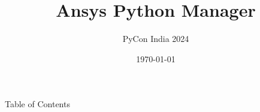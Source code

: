 \documentclass[t]{beamer}
\begin{document}
	
	
	\title{Ansys Python Manager}
	\subtitle{PyCon India 2024}
	\date{\today}
	\titleframe
	
	\begin{frame}{Table of Contents}
		\tableofcontents
		\vspace{200pt}  %
	\end{frame}
	
\end{document}
